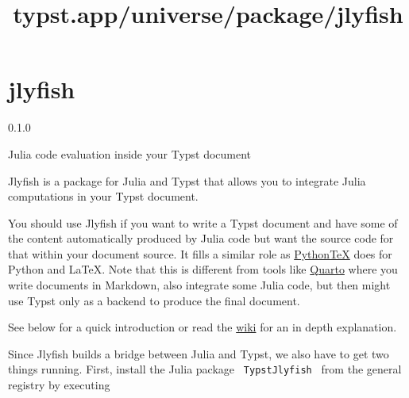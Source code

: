 \title{typst.app/universe/package/jlyfish}

\label{banner}
\section{jlyfish}\label{jlyfish}

{ 0.1.0 }

Julia code evaluation inside your Typst document

\label{readme}
\pandocbounded{}

Jlyfish is a package for Julia and Typst that allows you to integrate
Julia computations in your Typst document.

\href{https://github.com/andreasKroepelin/TypstJlyfish.jl/wiki}{}
\href{https://github.com/andreasKroepelin/TypstJlyfish.jl}{}

You should use Jlyfish if you want to write a Typst document and have
some of the content automatically produced by Julia code but want the
source code for that within your document source. It fills a similar
role as \href{https://github.com/gpoore/pythontex}{PythonTeX} does for
Python and LaTeX. Note that this is different from tools like
\href{https://quarto.org/}{Quarto} where you write documents in
Markdown, also integrate some Julia code, but then might use Typst only
as a backend to produce the final document.

See below for a quick introduction or read the
\href{https://github.com/andreasKroepelin/TypstJlyfish.jl/wiki}{wiki}
for an in depth explanation.

Since Jlyfish builds a bridge between Julia and Typst, we also have to
get two things running. First, install the Julia package
\texttt{\ TypstJlyfish\ } from the general registry by executing

\begin{Shaded}
\begin{Highlighting}[]
\NormalTok{julia\textgreater{} ]}

\end{Highlighting}
\end{Shaded}

